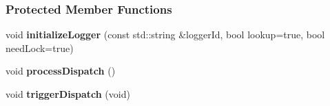 \subsubsection*{Protected Member Functions}
\begin{DoxyCompactItemize}
\item 
\hypertarget{a00097_ae687ebbee62b086f318ee4c8d1a655c4}{}void {\bfseries initialize\+Logger} (const std\+::string \&logger\+Id, bool lookup=true, bool need\+Lock=true)\label{a00097_ae687ebbee62b086f318ee4c8d1a655c4}

\item 
\hypertarget{a00097_a692d05d209840d6ae8c2c8e0bea21d29}{}void {\bfseries process\+Dispatch} ()\label{a00097_a692d05d209840d6ae8c2c8e0bea21d29}

\item 
\hypertarget{a00097_a1c7d90bd4e00af4e7307f5936e1b6507}{}void {\bfseries trigger\+Dispatch} (void)\label{a00097_a1c7d90bd4e00af4e7307f5936e1b6507}

\end{DoxyCompactItemize}
